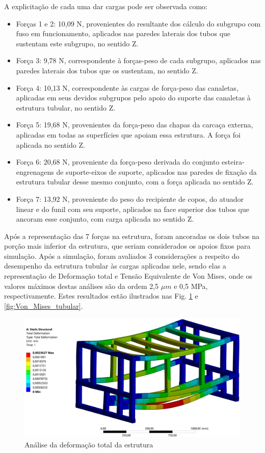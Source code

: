 A explicitação de cada uma dar cargas pode ser observada como:

\begin{itemize}
    \item Forças 1 e 2: 10,09 N, provenientes do resultante dos cálculo do subgrupo com fuso em funcionamento, aplicados nas paredes laterais dos tubos que sustentam este subgrupo, no sentido Z.
    \item Força 3: 9,78 N, correspondente à forças-peso de cada subgrupo, aplicados nas paredes laterais dos tubos que os sustentam, no sentido Z.
    \item Força 4: 10,13 N, correspondente às cargas de força-peso das canaletas, aplicadas em seus devidos subgrupos pelo apoio do suporte das canaletas à estrutura tubular, no sentido Z.
    \item Força 5: 19,68 N, provenientes da força-peso das chapas da carcaça externa, aplicadas em todas as superfícies que apoiam essa estrutura. A força foi aplicada no sentido Z.
    \item Força 6: 20,68 N, proveniente da força-peso derivada do conjunto esteira-engrenagens de suporte-eixos de suporte, aplicados nas paredes de fixação da estrutura tubular desse mesmo conjunto, com a força aplicada no sentido Z.
    \item Força 7: 13,92 N, proveniente do peso do recipiente de copos, do atuador linear e do funil com seu suporte, aplicados na face superior dos tubos que ancoram esse conjunto, com carga aplicada no sentido Z.
\end{itemize}

Após a representação das 7 forças na estrutura, foram ancoradas os dois tubos na porção mais inferior da estrutura, que seriam considerados os apoios fixos para simulação.
Após a simulação, foram avaliados 3 considerações a respeito do desempenho da estrutura tubular às cargas aplicadas nele, sendo elas a representação de Deformação total e Tensão Equivalente de Von Mises, onde os valores máximos destas análises são da ordem 2,5 $\mu m$  e 0,5 MPa, respectivamente. Estes resultados estão ilustrados nas Fig. \ref{fig:deformation_tubular} e \ref{fig:Von_Mises_tubular}.

\begin{figure}[ht]
    \centering
    \includegraphics[width=1\textwidth]{figuras/estrutura/AnaliseEstaticaTubular/Deformation_Tubular.png}
    \caption{Análise da deformação total da estrutura }
    \label{fig:deformation_tubular}
\end{figure}

